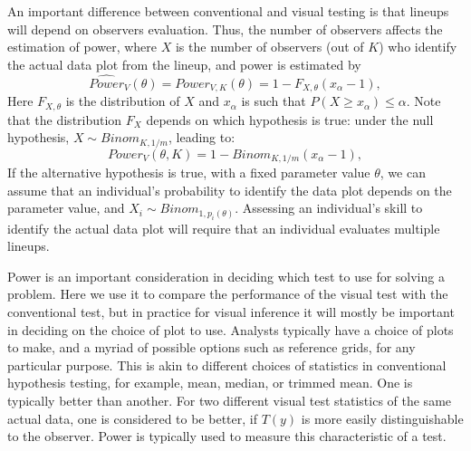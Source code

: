 \documentclass[12pt]{article}
\newcommand{\red}[1]{{\color{red} #1}}
\begin{document}
\noindent An important difference between conventional and visual testing is that lineups will depend on observers evaluation. Thus, the number of observers affects the estimation of power, where $X$ is the number of observers (out of $K$) who identify the actual data plot from the lineup, and power is estimated by
\[
\widehat{Power}_{V} (\theta) = {Power}_{V, K} (\theta) = 1 - F_{X, \theta} (x_{\alpha} - 1),
\] 
Here $F_{X, \theta}$ is the distribution of $X$ and $x_\alpha$ is such that $P(X \ge x_{\alpha}) \le \alpha$. Note that the distribution  $F_X$ depends on which hypothesis is true:
under the null hypothesis, $X \sim Binom_{K, 1/m}$, leading to:
\[
Power_V(\theta, K)= 1 - Binom_{K, 1/m} (x_\alpha - 1),
\]
If the alternative hypothesis is true, with a fixed parameter value $\theta$, we can assume that an individual's probability to identify the data plot depends on the parameter value, and $X_i \sim Binom_{1, p_i(\theta)}$. Assessing an individual's skill to identify the actual data plot will require that an individual evaluates multiple lineups.




Power is an important consideration in deciding which test to use for solving a problem. %
Here we use it to compare the performance of the visual test with the conventional test, but in practice for visual inference it will mostly be important in deciding on the choice of plot to use. Analysts typically have a choice of plots to make, and a myriad of possible options such as reference grids, for any particular purpose. This is akin to different choices of statistics in conventional hypothesis testing, for example, mean, median, or trimmed mean. One is typically better than another. For two different visual test statistics of the same actual data, one is considered to be better, if $T(y)$ is more easily distinguishable to the observer. Power is typically used to measure this characteristic of a test. %
\end{document}
